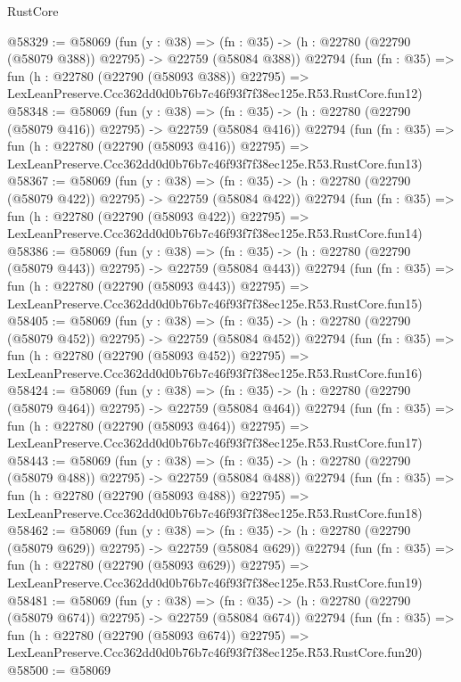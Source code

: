 \begin{lexlean}{RustCore}
\begin{coremodule}
@58329 := @58069
    (fun (y : @38) =>
    (fn : @35) -> (h : @22780 (@22790 (@58079 @388)) @22795) -> @22759 (@58084 @388))
    @22794
    (fun (fn : @35) =>
    fun (h : @22780 (@22790 (@58093 @388)) @22795) =>
    LexLeanPreserve.Ccc362dd0d0b76b7c46f93f7f38ec125e.R53.RustCore.fun12)
@58348 := @58069
    (fun (y : @38) =>
    (fn : @35) -> (h : @22780 (@22790 (@58079 @416)) @22795) -> @22759 (@58084 @416))
    @22794
    (fun (fn : @35) =>
    fun (h : @22780 (@22790 (@58093 @416)) @22795) =>
    LexLeanPreserve.Ccc362dd0d0b76b7c46f93f7f38ec125e.R53.RustCore.fun13)
@58367 := @58069
    (fun (y : @38) =>
    (fn : @35) -> (h : @22780 (@22790 (@58079 @422)) @22795) -> @22759 (@58084 @422))
    @22794
    (fun (fn : @35) =>
    fun (h : @22780 (@22790 (@58093 @422)) @22795) =>
    LexLeanPreserve.Ccc362dd0d0b76b7c46f93f7f38ec125e.R53.RustCore.fun14)
@58386 := @58069
    (fun (y : @38) =>
    (fn : @35) -> (h : @22780 (@22790 (@58079 @443)) @22795) -> @22759 (@58084 @443))
    @22794
    (fun (fn : @35) =>
    fun (h : @22780 (@22790 (@58093 @443)) @22795) =>
    LexLeanPreserve.Ccc362dd0d0b76b7c46f93f7f38ec125e.R53.RustCore.fun15)
@58405 := @58069
    (fun (y : @38) =>
    (fn : @35) -> (h : @22780 (@22790 (@58079 @452)) @22795) -> @22759 (@58084 @452))
    @22794
    (fun (fn : @35) =>
    fun (h : @22780 (@22790 (@58093 @452)) @22795) =>
    LexLeanPreserve.Ccc362dd0d0b76b7c46f93f7f38ec125e.R53.RustCore.fun16)
@58424 := @58069
    (fun (y : @38) =>
    (fn : @35) -> (h : @22780 (@22790 (@58079 @464)) @22795) -> @22759 (@58084 @464))
    @22794
    (fun (fn : @35) =>
    fun (h : @22780 (@22790 (@58093 @464)) @22795) =>
    LexLeanPreserve.Ccc362dd0d0b76b7c46f93f7f38ec125e.R53.RustCore.fun17)
@58443 := @58069
    (fun (y : @38) =>
    (fn : @35) -> (h : @22780 (@22790 (@58079 @488)) @22795) -> @22759 (@58084 @488))
    @22794
    (fun (fn : @35) =>
    fun (h : @22780 (@22790 (@58093 @488)) @22795) =>
    LexLeanPreserve.Ccc362dd0d0b76b7c46f93f7f38ec125e.R53.RustCore.fun18)
@58462 := @58069
    (fun (y : @38) =>
    (fn : @35) -> (h : @22780 (@22790 (@58079 @629)) @22795) -> @22759 (@58084 @629))
    @22794
    (fun (fn : @35) =>
    fun (h : @22780 (@22790 (@58093 @629)) @22795) =>
    LexLeanPreserve.Ccc362dd0d0b76b7c46f93f7f38ec125e.R53.RustCore.fun19)
@58481 := @58069
    (fun (y : @38) =>
    (fn : @35) -> (h : @22780 (@22790 (@58079 @674)) @22795) -> @22759 (@58084 @674))
    @22794
    (fun (fn : @35) =>
    fun (h : @22780 (@22790 (@58093 @674)) @22795) =>
    LexLeanPreserve.Ccc362dd0d0b76b7c46f93f7f38ec125e.R53.RustCore.fun20)
@58500 := @58069

\end{coremodule}
\end{lexlean}
